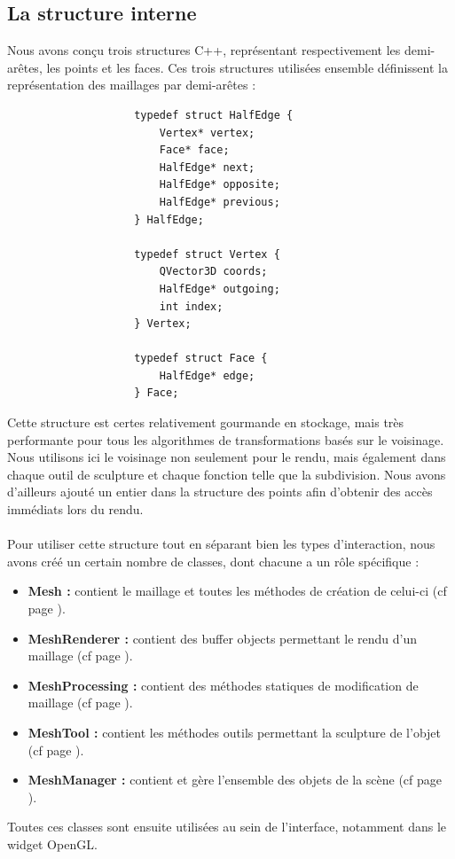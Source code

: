 \documentclass[a4paper]{memoir}
\begin{document}
			\subsection{La structure interne}
				Nous avons conçu trois structures C++, représentant respectivement les demi-arêtes, les points et les faces. Ces trois structures utilisées 
				ensemble définissent la représentation des maillages par demi-arêtes :
				\begin{verbatim}
					typedef struct HalfEdge {
						Vertex* vertex;
						Face* face;
						HalfEdge* next;
						HalfEdge* opposite;
						HalfEdge* previous;
					} HalfEdge;

					typedef struct Vertex {
						QVector3D coords;
						HalfEdge* outgoing;
						int index;
					} Vertex;

					typedef struct Face {
						HalfEdge* edge;
					} Face;
				\end{verbatim}
				Cette structure est certes relativement gourmande en stockage, mais très performante pour tous les algorithmes de transformations basés sur 
				le voisinage. Nous utilisons ici le voisinage non seulement pour le rendu, mais également dans chaque outil de sculpture et chaque fonction 
				telle que la subdivision. Nous avons d'ailleurs ajouté un entier dans la structure des points afin d'obtenir des accès immédiats lors du 
				rendu.\\
				\\
				Pour utiliser cette structure tout en séparant bien les types d'interaction, nous avons créé un certain nombre de classes, dont chacune a un 
				rôle spécifique :
				\begin{itemize}
					\item \textbf{Mesh :} contient le maillage et toutes les méthodes de création de celui-ci (cf page \pageref{mesh-dev}).
					\item \textbf{MeshRenderer :} contient des buffer objects permettant le rendu d'un maillage (cf page \pageref{renderer-dev}).
					\item \textbf{MeshProcessing :} contient des méthodes statiques de modification de maillage (cf page \pageref{processing-dev}).
					\item \textbf{MeshTool :} contient les méthodes outils permettant la sculpture de l'objet (cf page \pageref{tool-dev}).
					\item \textbf{MeshManager :} contient et gère l'ensemble des objets de la scène (cf page \pageref{manager-dev}).
				\end{itemize}
				Toutes ces classes sont ensuite utilisées au sein de l'interface, notamment dans le widget OpenGL.
				
\end{document}
